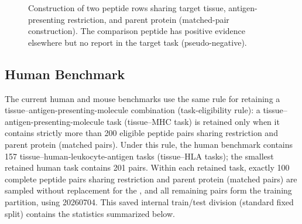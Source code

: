 \begin{figure}[tbp]
\centering
{}
\caption{Construction of two peptide rows sharing target tissue, antigen-presenting restriction, and parent protein (matched-pair construction). The comparison peptide has positive evidence elsewhere but no report in the target task (pseudo-negative).}
\label{fig:pair-construction}
\end{figure}

\subsection{Human Benchmark}

The current human and mouse benchmarks use the same rule for retaining a tissue--antigen-presenting-molecule combination (task-eligibility rule): a tissue--antigen-presenting-molecule task (tissue--MHC task) is retained only when it contains strictly more than 200 eligible peptide pairs sharing restriction and parent protein (matched pairs). Under this rule, the human benchmark contains 157 tissue--human-leukocyte-antigen tasks (tissue--HLA tasks); the smallest retained human task contains 201 pairs. Within each retained task, exactly 100 complete peptide pairs sharing restriction and parent protein (matched pairs) are sampled without replacement for the \plainFixedTest{}, and all remaining pairs form the training partition, using \plainSplitSeed{} 20260704. This saved internal train/test division (standard fixed split) contains the statistics summarized below.

